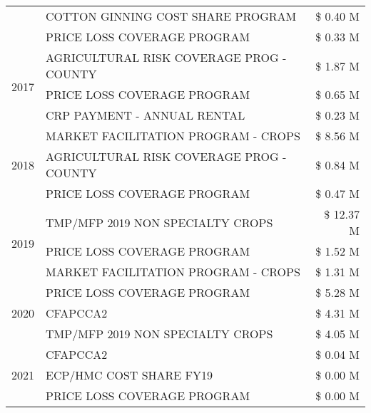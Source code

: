 \begin{tabular}{llr}
 & COTTON GINNING COST SHARE PROGRAM & \$ 0.40 M \\
 & PRICE LOSS COVERAGE PROGRAM & \$ 0.33 M \\
\cline{1-3}
\multirow[t]{3}{*}{2017} & AGRICULTURAL RISK COVERAGE PROG - COUNTY & \$ 1.87 M \\
 & PRICE LOSS COVERAGE PROGRAM & \$ 0.65 M \\
 & CRP PAYMENT - ANNUAL RENTAL & \$ 0.23 M \\
\cline{1-3}
\multirow[t]{3}{*}{2018} & MARKET FACILITATION PROGRAM - CROPS & \$ 8.56 M \\
 & AGRICULTURAL RISK COVERAGE PROG - COUNTY & \$ 0.84 M \\
 & PRICE LOSS COVERAGE PROGRAM & \$ 0.47 M \\
\cline{1-3}
\multirow[t]{3}{*}{2019} & TMP/MFP 2019 NON SPECIALTY CROPS & \$ 12.37 M \\
 & PRICE LOSS COVERAGE PROGRAM & \$ 1.52 M \\
 & MARKET FACILITATION PROGRAM - CROPS & \$ 1.31 M \\
\cline{1-3}
\multirow[t]{3}{*}{2020} & PRICE LOSS COVERAGE PROGRAM & \$ 5.28 M \\
 & CFAPCCA2 & \$ 4.31 M \\
 & TMP/MFP 2019 NON SPECIALTY CROPS & \$ 4.05 M \\
\cline{1-3}
\multirow[t]{3}{*}{2021} & CFAPCCA2 & \$ 0.04 M \\
 & ECP/HMC COST SHARE FY19 & \$ 0.00 M \\
 & PRICE LOSS COVERAGE PROGRAM & \$ 0.00 M \\
\cline{1-3}
\bottomrule
\end{tabular}
